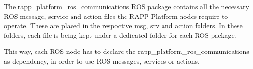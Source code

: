 The {\ttfamily rapp\-\_\-platform\-\_\-ros\-\_\-communications} R\-O\-S package contains all the necessary R\-O\-S message, service and action files the R\-A\-P\-P Platform nodes require to operate. These are placed in the respoctive {\ttfamily msg}, {\ttfamily srv} and {\ttfamily action} folders. In these folders, each file is being kept under a dedicated folder for each R\-O\-S package.

This way, each R\-O\-S node has to declare the {\ttfamily rapp\-\_\-platform\-\_\-ros\-\_\-communications} as dependency, in order to use R\-O\-S messages, services or actions. 